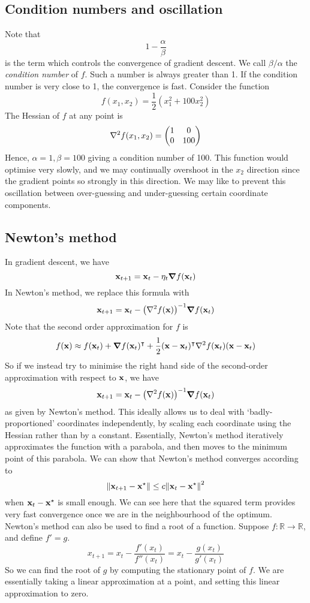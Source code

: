 \subsection{Condition numbers and oscillation}
Note that
\[
	1 - \frac{\alpha}{\beta}
\]
is the term which controls the convergence of gradient descent.
We call \(\beta/\alpha\) the \textit{condition number} of \(f\).
Such a number is always greater than 1.
If the condition number is very close to 1, the convergence is fast.
Consider the function
\[
	f(x_1, x_2) = \frac{1}{2}(x_1^2 + 100x_2^2)
\]
The Hessian of \(f\) at any point is
\[
	\laplacian{f(x_1, x_2)} = \begin{pmatrix}
		1 & 0 \\ 0 & 100
	\end{pmatrix}
\]
Hence, \(\alpha = 1, \beta = 100\) giving a condition number of 100.
This function would optimise very slowly, and we may continually overshoot in the \(x_2\) direction since the gradient points so strongly in this direction.
We may like to prevent this oscillation between over-guessing and under-guessing certain coordinate components.

\subsection{Newton's method}
In gradient descent, we have
\[
	\vb x_{t+1} = \vb x_t - \eta_t \grad{f(\vb x_t)}
\]
In Newton's method, we replace this formula with
\[
	\vb x_{t+1} = \vb x_t - \qty(\laplacian{f(\vb x)})^{-1} \grad{f(\vb x_t)}
\]
Note that the second order approximation for \(f\) is
\[
	f(\vb x) \approx f(\vb x_t) + \grad{f(\vb x_t)}^\transpose + \frac{1}{2}(\vb x - \vb x_t)^\transpose \laplacian{f(\vb x_t)}(\vb x - \vb x_t)
\]
So if we instead try to minimise the right hand side of the second-order approximation with respect to \(\vb x\), we have
\[
	\vb x_{t+1} = \vb x_t - \qty(\laplacian{f(\vb x)})^{-1} \grad{f(\vb x_t)}
\]
as given by Newton's method.
This ideally allows us to deal with `badly-proportioned' coordinates independently, by scaling each coordinate using the Hessian rather than by a constant.
Essentially, Newton's method iteratively approximates the function with a parabola, and then moves to the minimum point of this parabola.
We can show that Newton's method converges according to
\[
	\norm{\vb x_{t+1} - \vb x^\star} \leq c \norm{\vb x_{t} - \vb x^\star}^2
\]
when \(\vb x_t - \vb x^\star\) is small enough.
We can see here that the squared term provides very fast convergence once we are in the neighbourhood of the optimum.
Newton's method can also be used to find a root of a function.
Suppose \(f \colon \mathbb R \to \mathbb R\), and define \(f' = g\).
\[
	x_{t+1} = x_t - \frac{f'(x_t)}{f''(x_t)} = x_t - \frac{g(x_t)}{g'(x_t)}
\]
So we can find the root of \(g\) by computing the stationary point of \(f\).
We are essentially taking a linear approximation at a point, and setting this linear approximation to zero.

